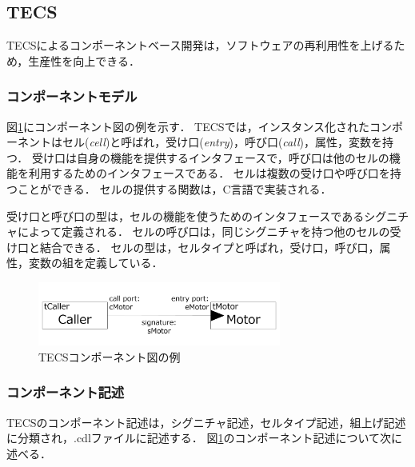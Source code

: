\documentclass[submit,techrep]{ipsj}
\begin{document}
\subsection{TECS\cite{par:TECS}}
TECSによるコンポーネントベース開発は，ソフトウェアの再利用性を上げるため，生産性を向上できる．


\subsubsection{コンポーネントモデル}
図\ref{fig:component}にコンポーネント図の例を示す．
TECSでは，インスタンス化されたコンポーネントはセル({\it cell})と呼ばれ，受け口({\it entry})，呼び口({\it call})，属性，変数を持つ．
受け口は自身の機能を提供するインタフェースで，呼び口は他のセルの機能を利用するためのインタフェースである．
セルは複数の受け口や呼び口を持つことができる．
セルの提供する関数は，C言語で実装される．

受け口と呼び口の型は，セルの機能を使うためのインタフェースであるシグニチャによって定義される．
セルの呼び口は，同じシグニチャを持つ他のセルの受け口と結合できる．
セルの型は，セルタイプと呼ばれ，受け口，呼び口，属性，変数の組を定義している．

\begin{figure}[t]
    \centering
    \includegraphics[width=8cm,clip]{../EMSOFT2016/figure/component_diagram.pdf}
    \vspace{-4mm}
    \caption{TECSコンポーネント図の例}
    \vspace{-5mm}
    \label{fig:component}
\end{figure}

\subsubsection{コンポーネント記述}
TECSのコンポーネント記述は，シグニチャ記述，セルタイプ記述，組上げ記述に分類され，.cdlファイルに記述する．
図\ref{fig:component}のコンポーネント記述について次に述べる．
\end{document}

